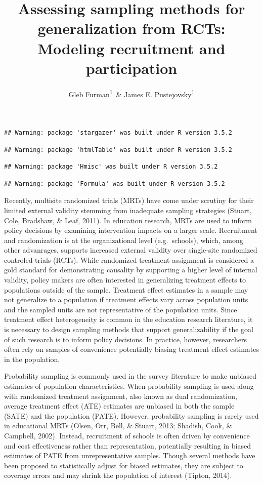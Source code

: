 \documentclass[man,floatsintext]{apa6}
\title{Assessing sampling methods for generalization from RCTs: Modeling
recruitment and participation}
\author{Gleb Furman\textsuperscript{1}~\& James E.
Pustejovsky\textsuperscript{1}}
\date{}
\affiliation{
\vspace{0.5cm}
\textsuperscript{1} University of Texas at Austin}
\theoremstyle{definition}
\theoremstyle{definition}
\theoremstyle{definition}
\theoremstyle{remark}
\begin{document}
\maketitle

\begin{verbatim}
## Warning: package 'stargazer' was built under R version 3.5.2
\end{verbatim}

\begin{verbatim}
## Warning: package 'htmlTable' was built under R version 3.5.2
\end{verbatim}

\begin{verbatim}
## Warning: package 'Hmisc' was built under R version 3.5.2
\end{verbatim}

\begin{verbatim}
## Warning: package 'Formula' was built under R version 3.5.2
\end{verbatim}

Recently, multisite randomized trials (MRTs) have come under scrutiny
for their limited external validity stemming from inadequate sampling
strategies (Stuart, Cole, Bradshaw, \& Leaf, 2011). In education
research, MRTs are used to inform policy decisions by examining
intervention impacts on a larger scale. Recruitment and randomization is
at the organizational level (e.g.~schools), which, among other
advanrages, supports increased external validity over single-site
randomized controled trials (RCTs). While randomized treatment
assignment is considered a gold standard for demonstrating causality by
supporting a higher level of internal validity, policy makers are often
interested in generalizing treatment effects to populations outside of
the sample. Treatment effect estimates in a sample may not generalize to
a population if treatment effects vary across population units and the
sampled units are not representative of the population units. Since
treatment effect heterogeneity is common in the education research
literature, it is necessary to design sampling methods that support
generalizability if the goal of such research is to inform policy
decisions. In practice, however, researchers often rely on samples of
convenience potentially biasing treatment effect estimates in the
population.

Probability sampling is commonly used in the survey literature to make
unbiased estimates of population characteristics. When probability
sampling is used along with randomized treatment assignment, also known
as dual randomization, average treatment effect (ATE) estimates are
unbiased in both the sample (SATE) and the population (PATE). However,
probability sampling is rarely used in educational MRTs (Olsen, Orr,
Bell, \& Stuart, 2013; Shadish, Cook, \& Campbell, 2002). Instead,
recruitment of schools is often driven by convenience and cost
effectiveness rather than representation, potentially resulting in
biased estimates of PATE from unrepresentative samples. Though several
methods have been proposed to statistically adjust for biased estimates,
they are subject to coverage errors and may shrink the population of
interest (Tipton, 2014).
\end{document}
